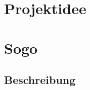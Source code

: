\documentclass[a4paper]{scrartcl}
\begin{document}
\newpage

%
%

\thispagestyle{empty}


\newpage

%
%

\setcounter{page}{3}
\section*{Projektidee}

\section{Sogo}
\subsection{Beschreibung}
\end{document}
